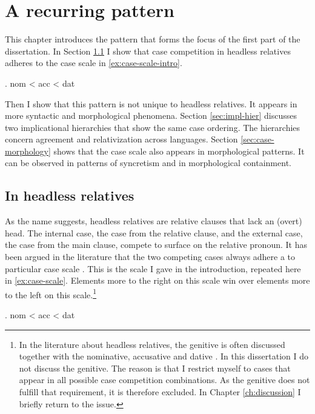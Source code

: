 
\chapter{A recurring pattern}\label{ch:recurring}

This chapter introduces the pattern that forms the focus of the first part of the dissertation. In Section \ref{sec:pattern-rels} I show that case competition in headless relatives adheres to the case scale in \ref{ex:case-scale-intro}.

\ex. \ac{nom} < \ac{acc} < \ac{dat}\label{ex:case-scale-intro}

Then I show that this pattern is not unique to headless relatives. It appears in more syntactic and morphological phenomena. Section \ref{sec:impl-hier} discusses two implicational hierarchies that show the same case ordering. The hierarchies concern agreement and relativization across languages. Section \ref{sec:case-morphology} shows that the case scale also appears in morphological patterns. It can be observed in patterns of syncretism and in morphological containment.


\section{In headless relatives}\label{sec:pattern-rels}

As the name suggests, headless relatives are relative clauses that lack an (overt) head. The internal case, the case from the relative clause, and the external case, the case from the main clause, compete to surface on the relative pronoun. It has been argued in the literature that the two competing cases always adhere a to particular case scale \citep[cf.][]{harbert1978,pittner1995,vogel2001,grosu2003,caha2019,bergsma2019}. This is the scale I gave in the introduction, repeated here in \ref{ex:case-scale}. Elements more to the right on this scale win over elements more to the left on this scale.\footnote{
In the literature about headless relatives, the genitive is often discussed together with the nominative, accusative and dative \citep[cf.][]{harbert1978,pittner1995}. In this dissertation I do not discuss the genitive. The reason is that I restrict myself to cases that appear in all possible case competition combinations. As the genitive does not fulfill that requirement, it is therefore excluded. In Chapter \ref{ch:discussion} I briefly return to the issue.
}

\ex. \ac{nom} < \ac{acc} < \ac{dat}\label{ex:case-scale}

